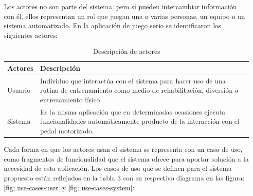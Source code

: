 \newpage
{}
Los actores no son parte del sistema, pero sí pueden intercambiar información con él, ellos representan un rol que juegan una o varias personas, un equipo o un sistema automatizado. En la aplicación de juego serio se identificaron los siguientes actores:

\begin{table}[ht]
    \centering
    \begin{tabularx}{\textwidth}{|l|X|}
        \hline
        \textbf{Actores} & \textbf{Descripción} \\\hline
        Usuario & Individuo que interactúa con el sistema para hacer uso de una rutina de entrenamiento
        como medio de rehabilitación, diversión o entrenamiento físico \\\hline
        Sistema & Es la misma aplicación que en determinadas ocasiones ejecuta funcionalidades automáticamente producto de la interacción con el pedal motorizado. \\\hline
    \end{tabularx}
    \label{tab: actores}
    \caption{Descripción de actores}
\end{table}

Cada forma en que los actores usan el sistema se representa con un caso de uso, como fragmentos de funcionalidad que el sistema ofrece para aportar solución a la necesidad de esta aplicación. Los casos de uso que se definen para el sistema propuesto están reflejados en la tabla 3 con su respectivo diagrama en las figura: \ref{fig: use-cases-user} y \ref{fig: use-cases-system}:

